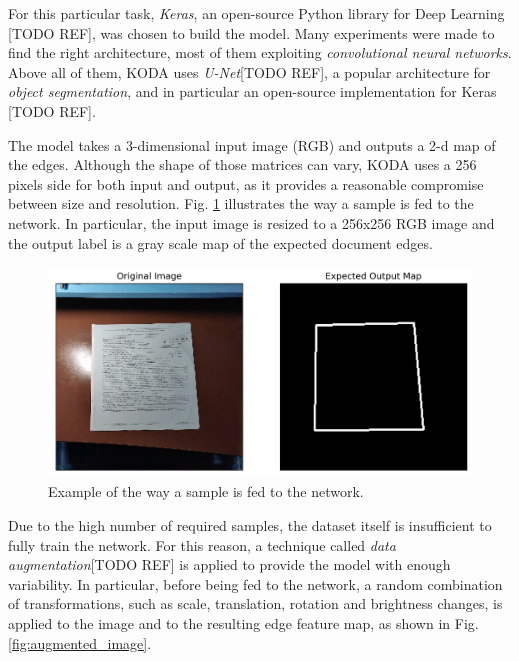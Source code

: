 \documentclass[a4paper]{article}
\begin{document}
For this particular task, \textit{Keras}, an open-source Python library for Deep Learning [TODO REF], was chosen to build the model. Many experiments were made to find the right architecture, most of them 
exploiting \textit{convolutional neural networks}. Above all of them, KODA uses \textit{U-Net}[TODO REF], a popular architecture for \textit{object segmentation}, and in particular an open-source implementation for Keras [TODO REF].

The model takes a 3-dimensional input image (RGB) and outputs a 2-d map of the edges. Although the shape
of those matrices can vary, KODA uses a 256 pixels side for both input and output, as it provides a reasonable compromise between size and resolution. Fig. \ref{fig:label_edge} illustrates the way a
sample is fed to the network. In particular, the input image is resized to a 256x256 RGB image and the
output label is a gray scale map of the expected document edges.

\begin{figure}[htb!]
	\includegraphics[width=\linewidth]{label_edge.png}
	\caption{Example of the way a sample is fed to the network.}
	\label{fig:label_edge}
\end{figure}

Due to the high number of required samples, the dataset itself is insufficient to fully train the network.
For this reason, a technique called \textit{data augmentation}[TODO REF] is applied to provide the model
with enough variability. In particular, before being fed to the network, a random combination of transformations, such as scale, translation, rotation and brightness changes, is applied to the image and to the resulting edge feature map, as shown in Fig. \ref{fig:augmented_image}.
\end{document}
